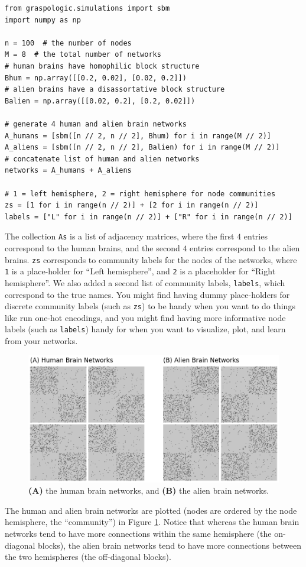 \begin{lstlisting}[style=python]
from graspologic.simulations import sbm
import numpy as np

n = 100  # the number of nodes
M = 8  # the total number of networks
# human brains have homophilic block structure
Bhum = np.array([[0.2, 0.02], [0.02, 0.2]])
# alien brains have a disassortative block structure
Balien = np.array([[0.02, 0.2], [0.2, 0.02]])

# generate 4 human and alien brain networks
A_humans = [sbm([n // 2, n // 2], Bhum) for i in range(M // 2)]
A_aliens = [sbm([n // 2, n // 2], Balien) for i in range(M // 2)]
# concatenate list of human and alien networks
networks = A_humans + A_aliens

# 1 = left hemisphere, 2 = right hemisphere for node communities
zs = [1 for i in range(n // 2)] + [2 for i in range(n // 2)]
labels = ["L" for i in range(n // 2)] + ["R" for i in range(n // 2)]
\end{lstlisting}

The collection \texttt{As} is a list of adjacency matrices, where the first $4$ entries correspond to the human brains, and the second $4$ entries correspond to the alien brains. \texttt{zs} corresponds to community labels for the nodes of the networks, where \texttt{1} is a place-holder for ``Left hemisphere'', and \texttt{2} is a placeholder for ``Right hemisphere''. We also added a second list of community labels, \texttt{labels}, which correspond to the true names. You might find having dummy place-holders for discrete community labels (such as \texttt{zs}) to be handy when you want to do things like run one-hot encodings, and you might find having more informative node labels (such as \texttt{labels}) handy for when you want to visualize, plot, and learn from your networks.

\begin{figure}[h]
    \centering
    \includegraphics[width=\linewidth]{representations/ch6/Images/multi_ex.png}
    \caption[Alien/Human brain network example]{\textbf{(A)} the human brain networks, and \textbf{(B)} the alien brain networks.}
    \label{fig:ch6:multinet:ex}
\end{figure}
The human and alien brain networks are plotted (nodes are ordered by the node hemisphere, the ``community'') in Figure \ref{fig:ch6:multinet:ex}. Notice that whereas the human brain networks tend to have more connections within the same hemisphere (the on-diagonal blocks), the alien brain networks tend to have more connections between the two hemispheres (the off-diagonal blocks). 


